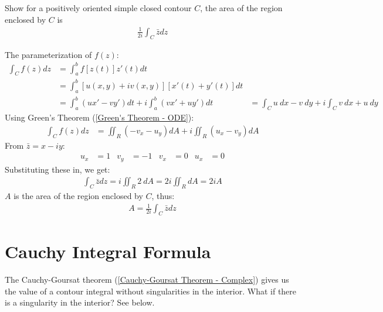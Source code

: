\documentclass[12pt, english]{book}
\makeatletter
\renewenvironment{proof}[1][\proofname]{\par
	\pushQED{\qed}%
	\normalfont \topsep6\p@\@plus6\p@\relax
	\list{}{%
		\settowidth{\leftmargin}{\itshape\proofname:\hskip\labelsep}%
		\setlength{\labelwidth}{0pt}%
		\setlength{\itemindent}{-\leftmargin}%
	}%
	\item[\hskip\labelsep\itshape#1\@addpunct{:}]\ignorespaces
	}{ \popQED\endlist\@endpefalse}
\makeatother
\begin{document}
	\begin{example}
		Show for a positively oriented simple closed contour \(C\), the area of the region enclosed by \(C\) is 
		\begin{align*}
			\frac{1}{2i} \int_{C} \bar{z} dz
		\end{align*}
		\begin{proof}
			The parameterization of \(f(z)\):
			\begin{align*}
				\int_{C} f(z) dz 
				&= \int_{a}^{b} f[z(t)] z'(t) dt \\
				&= \int_{a}^{b} [u(x,y) + iv(x,y)][x'(t) + y'(t)] dt \\
				&= \int_{a}^{b} (ux' - vy') dt + i \int_{a}^{b} (vx' + uy') dt
				&= \int_{C} u \ dx - v \ dy + i \int_{C} v \ dx + u \ dy
			\end{align*}
			Using Green's Theorem (\cref{Green's Theorem - ODE}):
			\begin{align*}
				\int_{C} f(z) dz 
				&= \iint_{R} (-v_x - u_y) dA + i \iint_{R} (u_x - v_y) dA
			\end{align*}
			{\color{Grey}
			From \(\bar{z} = x - iy\):
			\begin{align*}
				u_x &= 1 &	
				v_y &= -1 & 
				v_x &= 0 & 
				u_x &= 0
			\end{align*}
			Substituting these in, we get:
			\begin{align*}
				\int_{C} \bar{z} dz = i \iint_{R} 2 \ dA = 2i \iint_{R} dA = 2iA
			\end{align*}
			\(A\) is the area of the region enclosed by \(C\), thus:
			\begin{align*}
				A = \frac{1}{2i} \int_{C} \bar{z} dz
			\end{align*}
			}
		\end{proof}
	\end{example}
			
	


	\section{Cauchy Integral Formula} \label{Cauchy Integral Formula Section - Complex}
	
	The Cauchy-Goursat theorem (\cref{Cauchy-Goursat Theorem - Complex}) gives us the value of a contour integral without singularities in the interior. What if there is a singularity in the interior? See below.
	
\end{document}
